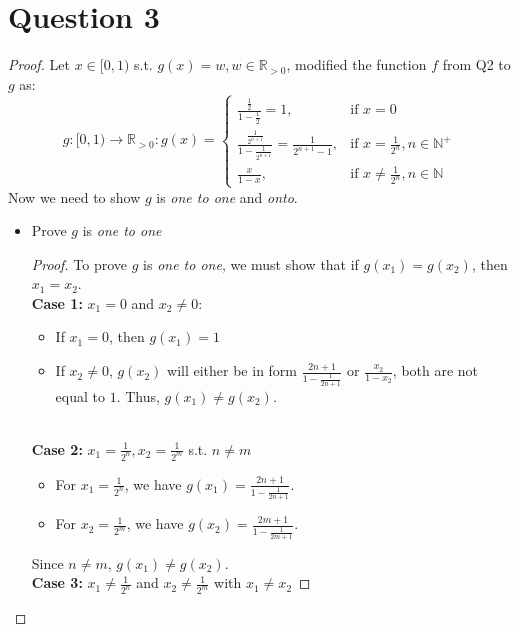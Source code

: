 \documentclass{article}
\begin{document}
\section*{Question 3}
\begin{proof}
    Let $x \in [0,1)$ s.t. $g(x) = w, w \in \mathbb{R}_{>0}$, modified the function $f$ from Q2 to $g$ as:
    \[ g: [0,1) \rightarrow \mathbb{R}_{>0}
    : g(x) =
        \begin{cases}
            \frac{\frac{1}{2}}{1 - \frac{1}{2}} = 1, & \text{if } x = 0  \\
            \frac{\frac{1}{2^{n+1}}}{1 - \frac{1}{2^{n+1}}} = \frac{1}{2^{n+1} - 1}, & \text{if } x = \frac{1}{2^n}, n \in \mathbb{N}^{+} \\
            \frac{x}{1 - x}, & \text{if } x \neq \frac{1}{2^n}, n \in \mathbb{N}
        \end{cases}
    \]
    Now we need to show $g$ is \textit{one to one} and \textit{onto}.
    \begin{itemize}
        \item Prove $g$ is \textit{one to one}
        \begin{proof}
            To prove $g$ is \textit{one to one}, we must show that if $g(x_1) = g(x_2)$, then $x_1 = x_2$.
            \\
            \textbf{Case 1:} \( x_1 = 0 \) and \( x_2 \neq 0 \):
            \begin{itemize}
                \item If \( x_1 = 0 \), then \( g(x_1) = 1 \)
                \item If \( x_2 \neq 0 \), \( g(x_2) \) will either be in form \( \frac{2n+1}{1 - \frac{1}{2n+1}} \) or \( \frac{x_2}{1 - x_2} \), both are not equal to $1$. Thus, \( g(x_1) \neq g(x_2) \).
            \end{itemize}
            \\
            \textbf{Case 2:} \( x_1 = \frac{1}{2^n}, x_2 = \frac{1}{2^m} \) s.t. \( n \neq m \)
            \begin{itemize}
                \item For \( x_1 = \frac{1}{2^n} \), we have \( g(x_1) = \frac{2n+1}{1 - \frac{1}{2n+1}} \).
                \item For \( x_2 = \frac{1}{2^m} \), we have \( g(x_2) = \frac{2m+1}{1 - \frac{1}{2m+1}} \).
            \end{itemize}
            Since \( n \neq m \), \( g(x_1) \neq g(x_2) \).
            \\
            \textbf{Case 3:} \( x_1 \neq \frac{1}{2^n} \) and \( x_2 \neq \frac{1}{2^m} \) with \( x_1 \neq x_2 \)

\end{proof}
\end{itemize}
\end{proof}
\end{document}
